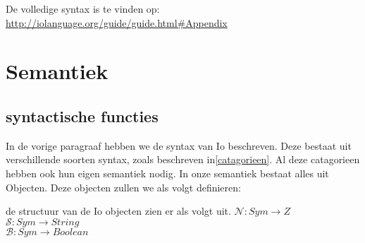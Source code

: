 \documentclass[12pt]{article}
\begin{document}
De volledige syntax is te vinden op: \url{http://iolanguage.org/guide/guide.html#Appendix}

\section{Semantiek}

\subsection{syntactische functies}
In de vorige paragraaf hebben we de syntax van Io beschreven. Deze bestaat uit verschillende soorten syntax, zoals beschreven in\ref{catagorieen}.
Al deze catagorieen hebben ook hun eigen semantiek nodig. 
In onze semantiek bestaat alles uit Objecten. Deze objecten zullen we als volgt definieren:

%
%
% 

de structuur van de Io objecten zien er als volgt uit.
$\mathcal{N}: Sym \rightarrow Z $ \\
$\mathcal{S}: Sym \rightarrow String $ \\
$\mathcal{B}: Sym \rightarrow Boolean $ \\
\end{document}
